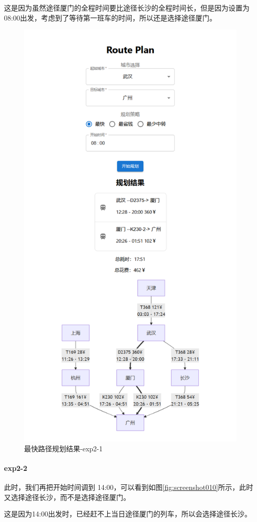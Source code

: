 \documentclass[10pt]{article}
\begin{document}
    这是因为虽然途径厦门的全程时间要比途径长沙的全程时间长，但是因为设置为08:00出发，考虑到了等待第一班车的时间，所以还是选择途径厦门。
    \begin{figure}
        \centering
        \includegraphics[width=0.7\linewidth]{img/screenshot009}
        \caption{最快路径规划结果-exp2-1}
        \label{fig:screenshot009}
    \end{figure}

    \paragraph{exp2-2}
    此时，我们再把开始时间调到 14:00，可以看到如图\ref{fig:screenshot010}所示，此时又选择途径长沙，而不是选择途径厦门。

    这是因为14:00出发时，已经赶不上当日途径厦门的列车，所以会选择途径长沙。
\end{document}
